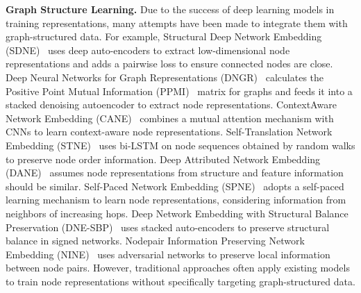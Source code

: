 \par\smallskip\noindent
\textbf{Graph Structure Learning.}
Due to the success of deep learning models in training representations, many attempts have been made to integrate them with graph-structured data. 
%
For example, Structural Deep Network Embedding (SDNE)~\cite{wang2016structural} uses deep auto-encoders to extract low-dimensional node representations and adds a pairwise loss to ensure connected nodes are close. 
%
Deep Neural Networks for Graph Representations (DNGR)~\cite{cao2016deep} calculates the Positive Point Mutual Information (PPMI)~\cite{bullinaria2007extracting} matrix for graphs and feeds it into a stacked denoising autoencoder to extract node representations. 
%
ContextAware Network Embedding (CANE)~\cite{tu2017cane} combines a mutual attention mechanism with CNNs to learn context-aware node representations. 
%
Self-Translation Network Embedding (STNE)~\cite{liu2018content} uses bi-LSTM on node sequences obtained by random walks to preserve node order information. 
%
Deep Attributed Network Embedding (DANE)~\cite{gao2018deep} assumes node representations from structure and feature information should be similar. 
%
Self-Paced Network Embedding (SPNE)~\cite{gao2018self} adopts a self-paced learning mechanism to learn node representations, considering information from neighbors of increasing hops. 
%
Deep Network Embedding with Structural Balance Preservation (DNE-SBP)~\cite{shen2018deep} uses stacked auto-encoders to preserve structural balance in signed networks. 
%
Nodepair Information Preserving Network Embedding (NINE)~\cite{wang2020node} uses adversarial networks to preserve local information between node pairs. 
%
However, traditional approaches often apply existing models to train node representations without specifically targeting graph-structured data.



